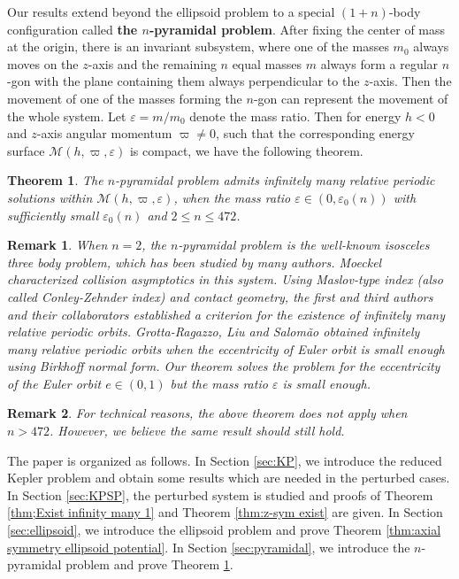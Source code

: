 \documentclass[11pt]{amsart}
\newcommand{\M}{\mathcal M}
\newcommand{\ep}{\varepsilon}
\newcommand{\om}{\varpi}
\newtheorem{thm}{Theorem}[section]
\newtheorem{remark}{Remark}[section]
\begin{document}
Our results extend beyond the ellipsoid problem to a special $(1+n)$-body configuration called \textbf{the $n$-pyramidal problem}. After fixing the center of mass at the origin, there is an invariant subsystem, where one of the masses $m_0$ always moves on the $z$-axis and the remaining $n$ equal masses $m$ always form a regular $n$-gon with the plane containing them always perpendicular to the $z$-axis. Then the movement of one of the masses forming the $n$-gon can represent the movement of the whole system. Let $\ep = m/m_0$ denote the mass ratio. Then for energy $h<0$ and $z$-axis angular momentum $\om\neq0$, such that the corresponding energy surface $\M(h,\om,\ep)$ is compact, we have the following theorem.

\begin{thm}\label{thm:The isosceles three body problem}
	The $n$-pyramidal problem admits infinitely many relative periodic solutions within $\M(h,\om,\ep)$, when the mass ratio $\ep\in(0,\ep_{0}(n))$ with sufficiently small $\ep_{0}(n)$ and $2\leq n\leq472$.
\end{thm}
\begin{remark}
	When $n=2$, the $n$-pyramidal problem is the well-known isosceles three body problem, which has been studied by many authors. Moeckel \cite{Mk84} characterized collision asymptotics in this system. Using Maslov-type index (also called Conley-Zehnder index) and contact geometry, the first and third authors and their collaborators \cite{Hu2023ASD} established a criterion for the existence of infinitely many relative periodic orbits. Grotta-Ragazzo, Liu and Salom{\~a}o \cite{GLSarxiv} obtained infinitely many relative periodic orbits when the eccentricity of Euler orbit is small enough using Birkhoff normal form. Our theorem solves the problem for the eccentricity of the Euler orbit $e\in(0,1)$ but the mass ratio $\ep$ is small enough.
\end{remark}
\begin{remark}
	For technical reasons, the above theorem does not apply when $n > 472$. However, we believe the same result should still hold.
\end{remark}



The paper is organized as follows. In Section \ref{sec:KP}, we introduce the reduced Kepler problem  and obtain some results which are needed in the perturbed cases. In Section \ref{sec:KPSP}, the perturbed system is studied and proofs of Theorem \ref{thm;Exist infinity many 1} and Theorem \ref{thm:z-sym exist} are given. In Section \ref{sec:ellipsoid}, we introduce the ellipsoid problem and prove Theorem \ref{thm:axial symmetry ellipsoid potential}. In Section \ref{sec:pyramidal}, we introduce the $n$-pyramidal problem and prove Theorem \ref{thm:The isosceles three body problem}.
\end{document}
